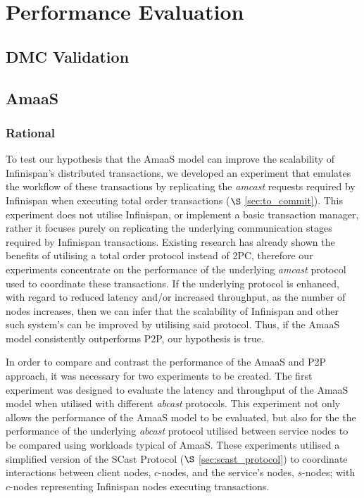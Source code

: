 \chapter{Performance Evaluation}

    \graphicspath{{Chapter6-PerformanceEvaluation/Figs/Vector/}{Chapter6-PerformanceEvaluation/Figs/}}
    

\section{DMC Validation}

\section{AmaaS}
    \subsection{Rational}
	To test our hypothesis that the \textsf{AmaaS} model can improve the scalability of Infinispan's distributed transactions, we developed an experiment that emulates the workflow of these transactions by replicating the \emph{amcast} requests required by Infinispan when executing total order transactions ($\S$ \ref{sec:to_commit}).  This experiment does not utilise Infinispan, or implement a basic transaction manager, rather it focuses purely on replicating the underlying communication stages required by Infinispan transactions.  Existing research \citep{Ruivo:2011:ETO:2120967.2121604} has already shown the benefits of utilising a total order protocol instead of 2PC, therefore our experiments concentrate on the performance of the underlying \emph{amcast} protocol used to coordinate these transactions.  If the underlying protocol is enhanced, with regard to reduced latency and/or increased throughput, as the number of nodes increases, then we can infer that the scalability of Infinispan and other such system's can be improved by utilising said protocol.  Thus, if the \textsf{AmaaS} model consistently outperforms P2P, our hypothesis is true.  
	
   In order to compare and contrast the performance of the \textsf{AmaaS} and P2P approach, it was necessary for two experiments to be created.  The first experiment was designed to evaluate the latency and throughput of the \textsf{AmaaS} model when utilised with different \emph{abcast} protocols.  This experiment not only allows the performance of the \textsf{AmaaS} model to be evaluated, but also for the the performance of the underlying \emph{abcast} protocol utilised between service nodes to be compared using workloads typical of \textsf{AmaaS}.  These experiments utilised a simplified version of the \textsf{SCast} Protocol ($\S$ \ref{sec:scast_protocol}) to coordinate interactions between client nodes, $c$-nodes, and the service's nodes, $s$-nodes; with $c$-nodes representing Infinispan nodes executing transactions.  
   
